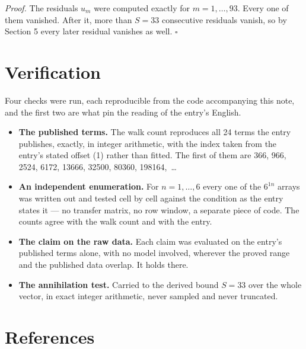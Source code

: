 \documentclass[11pt]{article}
\theoremstyle{definition}
\begin{document}
{\itshape Proof.} The residuals $u_m$ were computed exactly for $m = 1,\dots,93$. Every one of them vanished. After it, more than $S = 33$ consecutive residuals vanish, so by Section 5 every later residual vanishes as well. $\square$

\section{Verification}

Four checks were run, each reproducible from the code accompanying this note, and the first two are what pin the reading of the entry's English.

\begin{itemize}

\item {\bfseries The published terms.} The walk count reproduces all 24 terms the entry publishes, exactly, in integer arithmetic, with the index taken from the entry's stated offset (1) rather than fitted. The first of them are 366, 966, 2524, 6172, 13666, 32500, 80360, 198164,~\dots

\item {\bfseries An independent enumeration.} For $n = 1,\dots,6$ every one of the $6^{1n}$ arrays was written out and tested cell by cell against the condition as the entry states it --- no transfer matrix, no row window, a separate piece of code. The counts agree with the walk count and with the entry.

\item {\bfseries The claim on the raw data.} Each claim was evaluated on the entry's published terms alone, with no model involved, wherever the proved range and the published data overlap. It holds there.

\item {\bfseries The annihilation test.} Carried to the derived bound $S = 33$ over the whole vector, in exact integer arithmetic, never sampled and never truncated.

\end{itemize}

\section{References}
\end{document}
